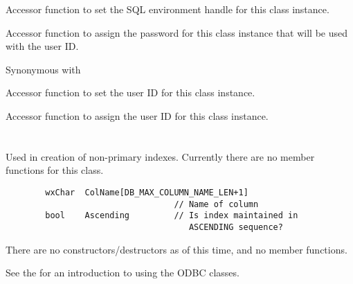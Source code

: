 \label{wxdbconnectinfsethenv}


Accessor function to set the SQL environment handle for this class instance.

\label{wxdbconnectinfsetpassword}


Accessor function to assign the password for this class
instance that will be used with the user ID.

Synonymous with 

\label{wxdbconnectinfsetuid}


Accessor function to set the user ID for this class instance.

\label{wxdbconnectinfsetuserid}


Accessor function to assign the user ID for this class instance.

\section{}\label{wxdbIndexdef}

Used in creation of non-primary indexes.  Currently there are no member
functions for this class.

\begin{verbatim}
        wxChar  ColName[DB_MAX_COLUMN_NAME_LEN+1]
                                  // Name of column
        bool    Ascending         // Is index maintained in
                                     ASCENDING sequence?
\end{verbatim}

There are no constructors/destructors as of this time, and no member functions.

See the  for
an introduction to using the ODBC classes.

\section{}\label{wxdbinf}

